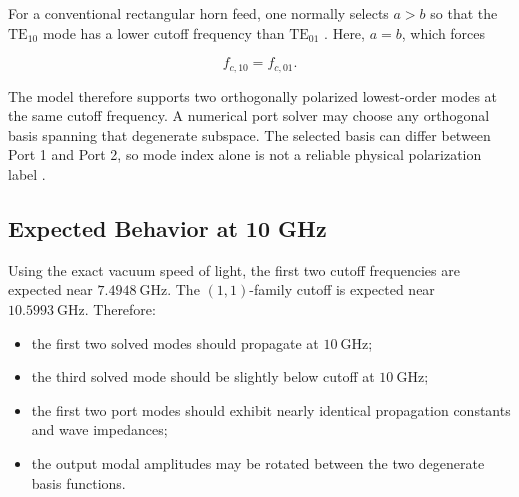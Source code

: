 For a conventional rectangular horn feed, one normally selects \(a>b\) so that the \(\mathrm{TE}_{10}\) mode has a lower cutoff frequency than \(\mathrm{TE}_{01}\) \cite{pozar2011microwave,stutzman2013antenna}. Here, \(a=b\), which forces

\[
f_{c,10}=f_{c,01}.
\]

The model therefore supports two orthogonally polarized lowest-order modes at the same cutoff frequency. A numerical port solver may choose any orthogonal basis spanning that degenerate subspace. The selected basis can differ between Port 1 and Port 2, so mode index alone is not a reliable physical polarization label \cite{pozar2011microwave}.

\subsection{Expected Behavior at 10 GHz}

Using the exact vacuum speed of light, the first two cutoff frequencies are expected near \(7.4948~\mathrm{GHz}\). The \((1,1)\)-family cutoff is expected near \(10.5993~\mathrm{GHz}\). Therefore:

\begin{itemize}
  \item the first two solved modes should propagate at \(10~\mathrm{GHz}\);
  \item the third solved mode should be slightly below cutoff at \(10~\mathrm{GHz}\);
  \item the first two port modes should exhibit nearly identical propagation constants and wave impedances;
  \item the output modal amplitudes may be rotated between the two degenerate basis functions.
\end{itemize}
